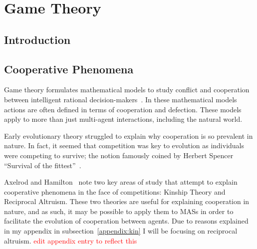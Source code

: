 \documentclass[]{final_report}
\begin{document}
\section{Game Theory}
\label{sec:backgroundgametheory}
\subsection{Introduction}

\subsection{Cooperative Phenomena}
Game theory formulates mathematical models to study conflict and cooperation between intelligent rational decision-makers~\cite{myerson2013game}. In these mathematical models actions are often defined in terms of cooperation and defection. These models apply to more than just multi-agent interactions, including the natural world.\par 
Early evolutionary theory struggled to explain why cooperation is so prevalent in nature. In fact, it seemed that competition was key to evolution as individuals were competing to survive; the notion famously coined by Herbert Spencer ``Survival of the fittest''~\cite{spencer1864principles}.\par
Axelrod and Hamilton~\cite{evolution_of_cooperation} note two key areas of study that attempt to explain cooperative phenomena in the face of competitions: Kinship Theory and Reciprocal Altruism. These two theories are useful for explaining cooperation in nature, and as such, it may be possible to apply them to MASs in order to facilitate the evolution of cooperation between agents. Due to reasons explained in my appendix in subsection~\ref{appendix:kin} I will be focusing on reciprocal altruism.
\textcolor{red}{edit appendix entry to reflect this}
\end{document}
